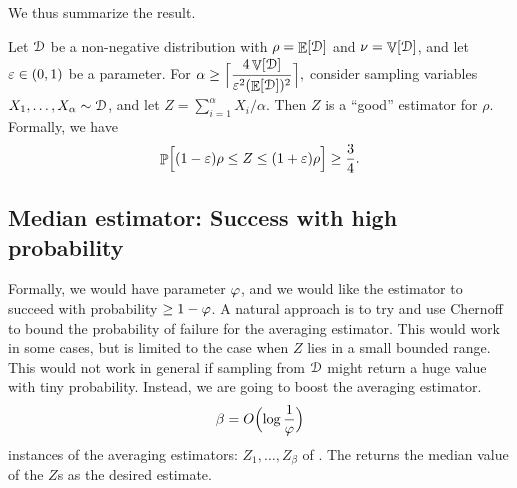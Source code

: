
We thus summarize the result.
\begin{lemma}
    Let $\EuScript{D}$ be a non-negative distribution with
    $\rho = \mathop{\mathbb{E}}\!\left[ {\EuScript{D}} \right]$ and $\nu = \mathop{\mathbb{V}}\!\left[ {\EuScript{D}} \right]$, and
    let ${\varepsilon} \in (0,1)$ be a parameter.  For
    \begin{math}
        \displaystyle%
        \alpha\geq \Bigl\lceil{ \frac{4 \VarSymb[\Distribution]\bigr.}
           {\eps^2(\ExSym[\Distribution])^2\bigr.}  } \Bigr\rceil,
    \end{math}
    consider sampling variables
    $X_1, \ldots, X_\alpha \sim \EuScript{D}$, and let
    $Z = \sum_{i=1}^\alpha X_i /\alpha$. Then $Z$ is a ``good''
    estimator for $\rho$. Formally, we have
    \begin{equation*}
        \Prob{ (1-\eps)\rho \leq Z \leq (1+\eps)\rho \Bigr.} \geq \frac{3}{4}.
    \end{equation*}
\end{lemma}




\subsection{Median estimator: Success with high probability}

 Formally, we would have parameter
$\varphi$, and we would like the estimator to succeed with
probability $\geq 1 - \varphi$.  A natural approach is to try and use
Chernoff to bound the probability of failure for the averaging
estimator. This would work in some cases, but is limited to the case
when $Z$ lies in a small bounded range. This would not work in general
if sampling from $\EuScript{D}$ might return a huge value with tiny
probability. Instead, we are going to boost the averaging
estimator. 
\begin{equation*}
    \beta = O\Bigl( \log \frac{1}{\varphi } \Bigr)
\end{equation*}
instances of the averaging estimators: $Z_1, \ldots, Z_\beta$ of
. The  returns the
median value of the $Z$s as the desired estimate.

